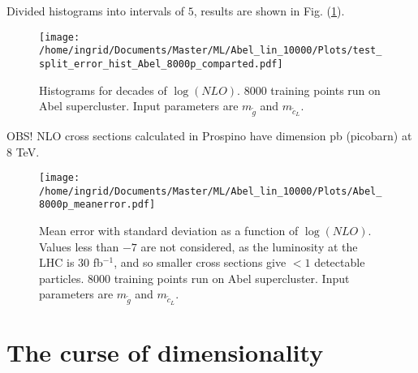 \documentclass[twoside,english]{uiofysmaster}
\begin{document}
Divided histograms into intervals of $5$, results are shown in Fig. (\ref{Fig:: Abel 8000p error hist divided}).

\begin{figure}
\centering
\texttt{[image: /home/ingrid/Documents/Master/ML/Abel\_lin\_10000/Plots/test\_split\_error\_hist\_Abel\_8000p\_comparted.pdf]}
\caption{Histograms for decades of $\log (NLO)$. 8000 training points run on Abel supercluster. Input parameters are $m_{\tilde{g}}$ and $m_{\tilde{c}_L}$.}
\label{Fig:: Abel 8000p error hist divided}
\end{figure}

OBS! NLO cross sections calculated in Prospino have dimension pb (picobarn) at 8 TeV.

\begin{figure}
\centering
\texttt{[image: /home/ingrid/Documents/Master/ML/Abel\_lin\_10000/Plots/Abel\_8000p\_meanerror.pdf]}
\caption{Mean error with standard deviation as a function of $\log (NLO)$. Values less than $-7$ are not considered, as the luminosity at the LHC is $30$ fb$^{-1}$, and so smaller cross sections give $<1$ detectable particles. 8000 training points run on Abel supercluster. Input parameters are $m_{\tilde{g}}$ and $m_{\tilde{c}_L}$.}
\label{Fig:: Abel 8000p mean error with std}
\end{figure}




\section{The curse of dimensionality}
















\end{document}

